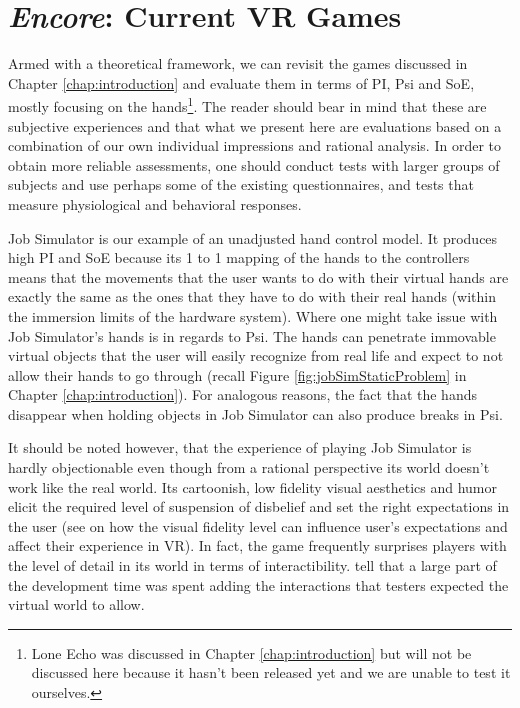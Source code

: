 \section{\textit{Encore}: Current VR Games}
\label{sec:soaRevisited}

Armed with a theoretical framework, we can revisit the games discussed in Chapter \ref{chap:introduction} and evaluate them in terms of PI, Psi and SoE, mostly focusing on the hands\footnote{Lone Echo was discussed in Chapter \ref{chap:introduction} but will not be discussed here because it hasn't been released yet and we are unable to test it ourselves.}. The reader should bear in mind that these are subjective experiences and that what we present here are evaluations based on a combination of our own individual impressions and rational analysis. In order to obtain more reliable assessments, one should conduct tests with larger groups of subjects and use perhaps some of the existing questionnaires, and tests that measure physiological and behavioral responses.

Job Simulator is our example of an unadjusted hand control model. It produces high PI and SoE because its 1 to 1 mapping of the hands to the controllers means that the movements that the user wants to do with their virtual hands are exactly the same as the ones that they have to do with their real hands (within the immersion limits of the hardware system). Where one might take issue with Job Simulator's hands is in regards to Psi. The hands can penetrate immovable virtual objects that the user will easily recognize from real life and expect to not allow their hands to go through (recall Figure \ref{fig:jobSimStaticProblem} in Chapter \ref{chap:introduction}). For analogous reasons, the fact that the hands disappear when holding objects in Job Simulator can also produce breaks in Psi.

It should be noted however, that the experience of playing Job Simulator is hardly objectionable even though from a rational perspective its world doesn't work like the real world. Its cartoonish, low fidelity visual aesthetics and humor elicit the required level of suspension of disbelief and set the right expectations in the user (see \parencite{Nowak2003, Argelaguet2016} on how the visual fidelity level can influence user's expectations and affect their experience in VR). In fact, the game frequently surprises players with the level of detail in its world in terms of interactibility. \parencite{Schwartz2017} tell that a large part of the development time was spent adding the interactions that testers expected the virtual world to allow.

